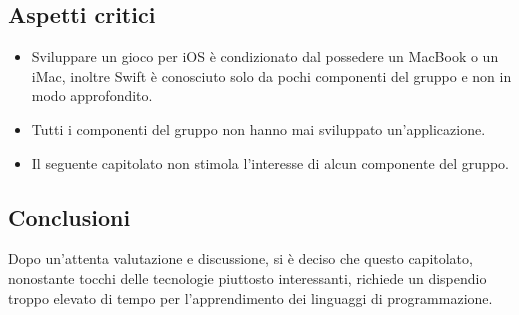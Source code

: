  \subsection{Aspetti critici}
\begin{itemize}
	\item Sviluppare un gioco per iOS è condizionato dal possedere un MacBook o un iMac, inoltre Swift è conosciuto solo da pochi componenti del gruppo e non in modo approfondito.
	\item Tutti i componenti del gruppo non hanno mai sviluppato un'applicazione.
	\item Il seguente capitolato non stimola l'interesse di alcun componente del gruppo.
\end{itemize}

\subsection{Conclusioni}
Dopo un'attenta valutazione e discussione, si è deciso che questo capitolato, nonostante tocchi delle tecnologie piuttosto interessanti, richiede un dispendio troppo elevato di tempo per l'apprendimento dei linguaggi di programmazione.
